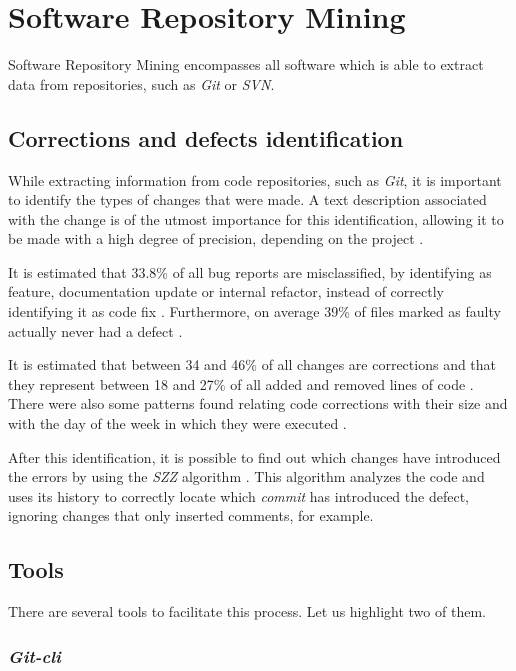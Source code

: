 \section{Software Repository Mining}

Software Repository Mining encompasses all software which is able to extract data from repositories, such as \emph{Git} or \emph{SVN}.

\subsection{Corrections and defects identification}

While extracting information from code repositories, such as \emph{Git}, it is important to identify the types of changes that were made. A text description associated with the change is of the utmost importance for this identification, allowing it to be made with a high degree of precision, depending on the project \cite{Mockus2000}.

It is estimated that 33.8\% of all bug reports are misclassified, by identifying as feature, documentation update or internal refactor, instead of correctly identifying it as code fix \cite{Herzig2013b}. Furthermore, on average 39\% of files marked as faulty actually never had a defect \cite{Herzig2013b}.

It is estimated that between 34 and 46\% of all changes are corrections and that they represent between 18 and 27\% of all added and removed lines of code \cite{Mockus2000}. There were also some patterns found relating code corrections with their size and with the day of the week in which they were executed \cite{Sliwerski2005}.

After this identification, it is possible to find out which changes have introduced the errors by using the \emph{SZZ} algorithm \cite{Sliwerski2005}. This algorithm analyzes the code and uses its history to correctly locate which \emph{commit} has introduced the defect, ignoring changes that only inserted comments, for example.

\subsection{Tools}

There are several tools to facilitate this process. Let us highlight two of them.

\subsubsection{\emph{Git-cli}}

